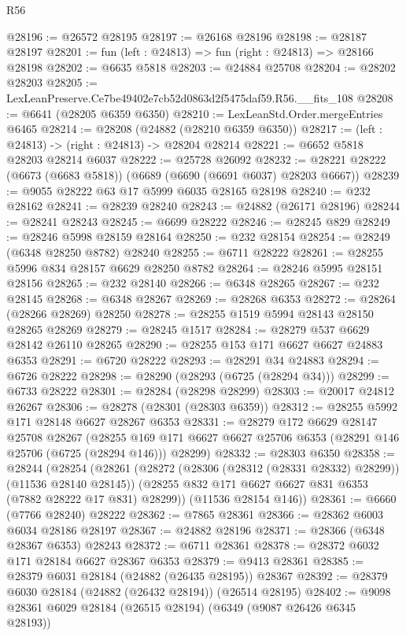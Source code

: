 \begin{lexlean}{R56}
\begin{coremodule}
@28196 := @26572 @28195
@28197 := @26168 @28196
@28198 := @28187 @28197
@28201 := fun (left : @24813) => fun (right : @24813) => @28166 @28198
@28202 := @6635 @5818
@28203 := @24884 @25708
@28204 := @28202 @28203
@28205 := LexLeanPreserve.Ce7be49402e7cb52d0863d2f5475daf59.R56.__fits_108
@28208 := @6641 (@28205 @6359 @6350)
@28210 := LexLeanStd.Order.mergeEntries @6465
@28214 := @28208 (@24882 (@28210 @6359 @6350))
@28217 := (left : @24813) -> (right : @24813) -> @28204 @28214
@28221 := @6652 @5818 @28203 @28214 @6037
@28222 := @25728 @26092
@28232 := @28221 @28222 (@6673 (@6683 @5818)) (@6689 (@6690 (@6691 @6037) @28203 @6667))
@28239 := @9055 @28222 @63 @17 @5999 @6035 @28165 @28198
@28240 := @232 @28162
@28241 := @28239 @28240
@28243 := @24882 (@26171 @28196)
@28244 := @28241 @28243
@28245 := @6699 @28222
@28246 := @28245 @829
@28249 := @28246 @5998 @28159 @28164
@28250 := @232 @28154
@28254 := @28249 (@6348 @28250 @8782) @28240
@28255 := @6711 @28222
@28261 := @28255 @5996 @834 @28157 @6629 @28250 @8782
@28264 := @28246 @5995 @28151 @28156
@28265 := @232 @28140
@28266 := @6348 @28265
@28267 := @232 @28145
@28268 := @6348 @28267
@28269 := @28268 @6353
@28272 := @28264 (@28266 @28269) @28250
@28278 := @28255 @1519 @5994 @28143 @28150 @28265 @28269
@28279 := @28245 @1517
@28284 := @28279 @537 @6629 @28142 @26110 @28265
@28290 := @28255 @153 @171 @6627 @6627 @24883 @6353
@28291 := @6720 @28222
@28293 := @28291 @34 @24883
@28294 := @6726 @28222
@28298 := @28290 (@28293 (@6725 (@28294 @34)))
@28299 := @6733 @28222
@28301 := @28284 (@28298 @28299)
@28303 := @20017 @24812 @26267
@28306 := @28278 (@28301 (@28303 @6359))
@28312 := @28255 @5992 @171 @28148 @6627 @28267 @6353
@28331 := @28279
    @172
    @6629
    @28147
    @25708
    @28267
    (@28255 @169 @171 @6627 @6627 @25706 @6353 (@28291 @146 @25706 (@6725 (@28294 @146))) @28299)
@28332 := @28303 @6350
@28358 := @28244
    (@28254
      (@28261
        (@28272 (@28306 (@28312 (@28331 @28332) @28299)) (@11536 @28140 @28145))
        (@28255 @832 @171 @6627 @6627 @831 @6353 (@7882 @28222 @17 @831) @28299))
      (@11536 @28154 @146))
@28361 := @6660 (@7766 @28240) @28222
@28362 := @7865 @28361
@28366 := @28362 @6003 @6034 @28186 @28197
@28367 := @24882 @28196
@28371 := @28366 (@6348 @28367 @6353) @28243
@28372 := @6711 @28361
@28378 := @28372 @6032 @171 @28184 @6627 @28367 @6353
@28379 := @9413 @28361
@28385 := @28379 @6031 @28184 (@24882 (@26435 @28195)) @28367
@28392 := @28379 @6030 @28184 (@24882 (@26432 @28194)) (@26514 @28195)
@28402 := @9098 @28361 @6029 @28184 (@26515 @28194) (@6349 (@9087 @26426 @6345 @28193))

\end{coremodule}
\end{lexlean}
